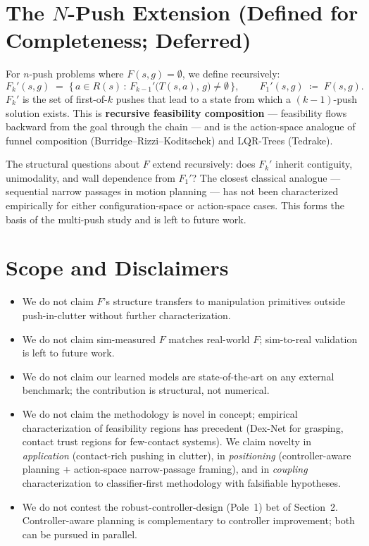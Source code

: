 \documentclass[11pt]{article}
\begin{document}
\section{The $N$-Push Extension (Defined for Completeness; Deferred)}\label{sec:npush}

For $n$-push problems where $F(s, g) = \emptyset$, we define recursively:
\[
  F_k'(s, g) \;=\; \{\,a \in R(s) \,:\, F_{k-1}'\big(T(s, a),\, g\big) \neq \emptyset\,\},
  \qquad F_1'(s, g) \;\coloneqq\; F(s, g).
\]
$F_k'$ is the set of first-of-$k$ pushes that lead to a state from which a
$(k-1)$-push solution exists. This is \textbf{recursive feasibility
composition} --- feasibility flows backward from the goal through the chain
--- and is the action-space analogue of funnel composition
(Burridge--Rizzi--Koditschek) and LQR-Trees (Tedrake).

The structural questions about $F$ extend recursively: does $F_k'$ inherit
contiguity, unimodality, and wall dependence from $F_1'$? The closest
classical analogue --- sequential narrow passages in motion planning --- has
not been characterized empirically for either configuration-space or
action-space cases. This forms the basis of the multi-push study and is left
to future work.

\section{Scope and Disclaimers}

\begin{itemize}[leftmargin=2em,itemsep=0pt]
  \item We do not claim $F$'s structure transfers to manipulation primitives
        outside push-in-clutter without further characterization.
  \item We do not claim sim-measured $F$ matches real-world $F$; sim-to-real
        validation is left to future work.
  \item We do not claim our learned models are state-of-the-art on any
        external benchmark; the contribution is structural, not numerical.
  \item We do not claim the methodology is novel in concept; empirical
        characterization of feasibility regions has precedent (Dex-Net for
        grasping, contact trust regions for few-contact systems). We claim
        novelty in \emph{application} (contact-rich pushing in clutter), in
        \emph{positioning} (controller-aware planning + action-space
        narrow-passage framing), and in \emph{coupling} characterization to
        classifier-first methodology with falsifiable hypotheses.
  \item We do not contest the robust-controller-design (Pole~1) bet of
        Section~2. Controller-aware planning is complementary to controller
        improvement; both can be pursued in parallel.
\end{itemize}
\end{document}
